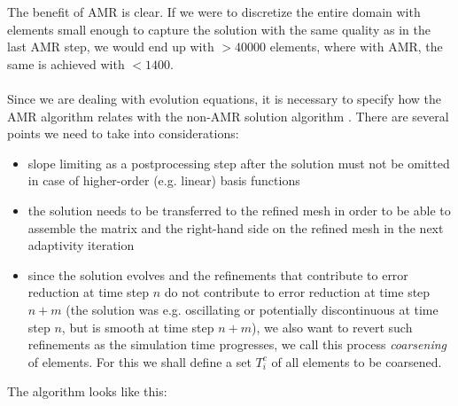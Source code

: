 The benefit of AMR is clear. If we were to discretize the entire domain with elements small enough to capture the solution with the same quality as in the last AMR step, we would end up with $> 40000$ elements, where with AMR, the same is achieved with $< 1400$.

\paragraph{}
Since we are dealing with evolution equations, it is necessary to specify how the AMR algorithm relates with the non-AMR solution algorithm . There are several points we need to take into considerations:
\begin{itemize}
	\item slope limiting as a postprocessing step after the solution must not be omitted in case of higher-order (e.g. linear) basis functions
	\item the solution needs to be transferred to the refined mesh in order to be able to assemble the matrix and the right-hand side on the refined mesh in the next adaptivity iteration
	\item since the solution evolves and the refinements that contribute to error reduction at time step $n$ do not contribute to error reduction at time step $n + m$ (the solution was e.g. oscillating or potentially discontinuous at time step $n$, but is smooth at time step $n + m$), we also want to revert such refinements as the simulation time progresses, we call this process \textit{coarsening} of elements. For this we shall define a set $T^{c}_i$ of all elements to be coarsened.
\end{itemize}
The algorithm looks like this:

